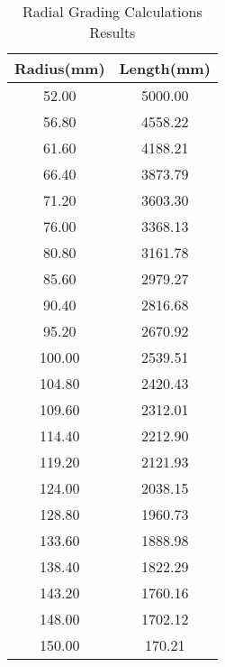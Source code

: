 \begin{table}[!htb]
\caption{Radial Grading Calculations Results}
\label{table:radialvals}
\begin{center}
\begin{tabular}{cc}
\toprule
\textbf{Radius(mm)} & \textbf{Length(mm)} \\ \toprule
52.00 & 5000.00 \\
56.80 & 4558.22 \\
61.60 & 4188.21 \\
66.40 & 3873.79 \\
71.20 & 3603.30 \\
76.00 & 3368.13 \\
80.80 & 3161.78 \\
85.60 & 2979.27 \\
90.40 & 2816.68 \\
95.20 & 2670.92 \\
100.00 & 2539.51 \\
104.80 & 2420.43 \\
109.60 & 2312.01 \\
114.40 & 2212.90 \\
119.20 & 2121.93 \\
124.00 & 2038.15 \\
128.80 & 1960.73 \\
133.60 & 1888.98 \\
138.40 & 1822.29 \\
143.20 & 1760.16 \\
148.00 & 1702.12 \\
150.00 & 170.21 \\
\bottomrule
\end{tabular}
\end{center}
\end{table}
